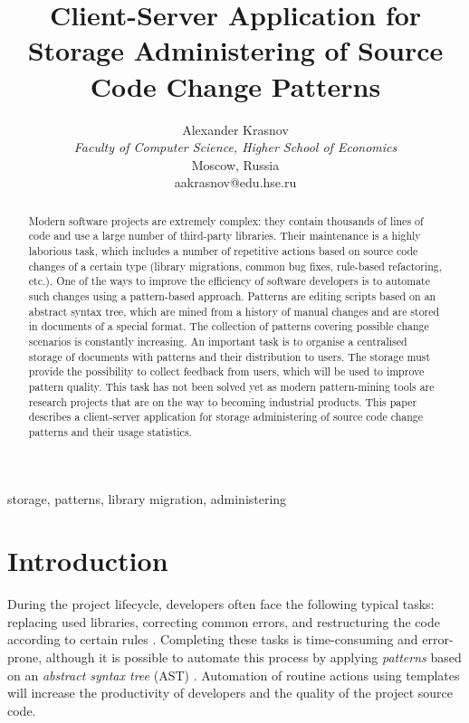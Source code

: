 \documentclass[letterpaper, 10 pt, conference]{ieeeconf}  %
\title{\LARGE \bf
Client-Server Application for Storage Administering of Source Code Change Patterns
}
\author{
Alexander Krasnov \\ 
\textit{Faculty of Computer Science, Higher School of Economics} \\
Moscow, Russia \\
aakrasnov@edu.hse.ru
}
\begin{document}
\maketitle
\thispagestyle{empty}
\pagestyle{empty}

\begin{abstract}

Modern software projects are extremely complex: they contain thousands of lines
of code and use a large number of third-party libraries.
Their maintenance is a highly laborious task, which includes a number of
repetitive actions based on source code changes of a certain type (library
migrations, common bug fixes, rule-based refactoring, etc.).
One of the ways to improve the efficiency of software developers is to
automate such changes using a pattern-based approach. 
Patterns are editing scripts based on an abstract syntax tree, which are 
mined from a history of manual changes and are stored in documents of a 
special format. 
The collection of patterns covering possible change scenarios is constantly
increasing.
An important task is to organise a centralised storage of documents with
patterns and their distribution to users. 
The storage must provide the possibility to collect feedback from users, 
which will be used to improve pattern quality. 
This task has not been solved yet as modern pattern-mining tools are research
projects that are on the way to becoming industrial products.
This paper describes a client-server application for storage administering of
source code change patterns and their usage statistics.
\end{abstract}

\begin{keywords} 
storage, patterns, library migration, administering
\end{keywords}


\section{Introduction}
During the project lifecycle, developers often face the following
typical tasks: replacing used libraries, correcting common errors,
and restructuring the code according to certain rules \cite{c4}. 
Completing these tasks is time-consuming and error-prone, although it is
possible to automate this process by applying \emph{patterns} based on an
\emph{abstract syntax tree} (AST) \cite{c1, c2, c3}. 
Automation of routine actions using templates will increase the productivity of
developers and the quality of the project source code.
\end{document}
